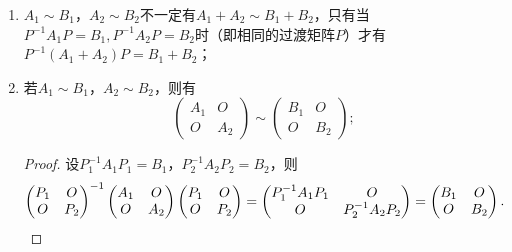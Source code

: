 \begin{enumerate}
\begin{proof}
\begin{enumerate}
                  \item 由于$B^{-1}=(C^{-1}AC)^{-1}=C^{-1}A^{-1}C$，因此$A^{-1}\sim B^{-1}$.

                  \item 由于$B^*=(C^{-1}AC)^*=C^*A^*(C^{-1})^*=((C^*)^{-1})^{-1}A^*(C^*)^{-1}$，因此$A^*\sim B^*$.
              \end{enumerate}
          \end{proof}

    \item $A_1\sim B_1$，$A_2\sim B_2$不一定有$A_1+A_2\sim B_1+B_2$，只有当$P^{-1}A_1P=B_1,P^{-1}A_2P=B_2$时（即相同的过渡矩阵$P$）才有$P^{-1}(A_1+A_2)P=B_1+B_2$；

    \item 若$A_1\sim B_1$，$A_2\sim B_2$，则有
          \[ \begin{pmatrix}
                  A_1 & O \\ O & A_2
              \end{pmatrix}\sim\begin{pmatrix}
                  B_1 & O \\ O & B_2
              \end{pmatrix};\]

          \begin{proof}
              设$P_1^{-1}A_1P_1=B_1$，$P_2^{-1}A_2P_2=B_2$，则
              \[ \begin{pmatrix}
                      P_1 & O \\ O & P_2
                  \end{pmatrix}^{-1}\begin{pmatrix}
                      A_1 & O \\ O & A_2
                  \end{pmatrix}\begin{pmatrix}
                      P_1 & O \\ O & P_2
                  \end{pmatrix}=\begin{pmatrix}
                      P_1^{-1}A_1P_1 & O \\ O & P_2^{-1}A_2P_2
                  \end{pmatrix}=\begin{pmatrix}
                      B_1 & O \\ O & B_2
                  \end{pmatrix}. \qedhere\]
          \end{proof}


\end{enumerate}
